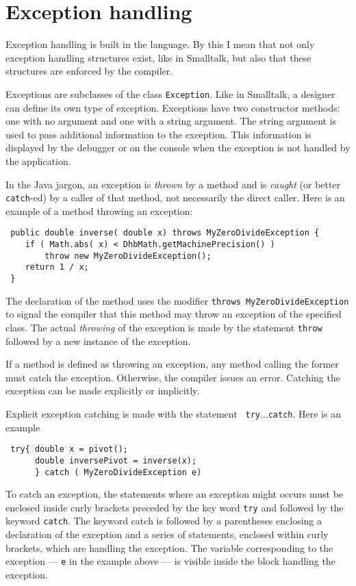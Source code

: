 \documentclass[twoside]{book}
\begin{document}
\section{Exception handling}
Exception handling is built in the language. By this I mean that
not only exception handling structures exist, like in Smalltalk,
but also that these structures are enforced by the compiler.

Exceptions are subclasses of the class {\tt Exception}. Like in
Smalltalk, a designer can define its own type of exception.
Exceptions have two constructor methods: one with no argument and
one with a string argument. The string argument is used to pass
additional information to the exception. This information is
displayed by the debugger or on the console when the exception is
not handled by the application.

In the Java jargon, an exception is {\sl thrown} by a method and
is {\sl caught} (or better {\tt catch}-ed) by a caller of that
method, not necessarily the direct caller. Here is an example of a
method throwing an exception:
\begin{verbatim}
 public double inverse( double x) throws MyZeroDivideException {
    if ( Math.abs( x) < DhbMath.getMachinePrecision() )
        throw new MyZeroDivideException();
    return 1 / x;
 }
\end{verbatim}
The declaration of the method uses the modifier {\tt throws
MyZeroDivideException} to signal the compiler that this method may
throw an exception of the specified class. The actual {\sl
throwing} of the exception is made by the statement {\tt throw}
followed by a new instance of the exception.

If a method is defined as throwing an exception, any method
calling the former must catch the exception. Otherwise, the
compiler issues an error. Catching the exception can be made
explicitly or implicitly.

Explicit exception catching is made with the statement {\tt
try$\ldots$catch}. Here is an example
\begin{verbatim}
 try{ double x = pivot();
      double inversePivot = inverse(x);
      } catch ( MyZeroDivideException e)
\end{verbatim}
\noindent To catch an exception, the statements where an exception
might occurs must be enclosed inside curly brackets preceded by
the key word {\tt try} and followed by the keyword {\tt catch}.
The keyword catch is followed by a parentheses enclosing a
declaration of the exception and a series of statements, enclosed
within curly brackets, which are handling the exception. The
variable corresponding to the exception --- {\tt e} in the example
above
--- is visible inside the block handling the exception.
\end{document}
